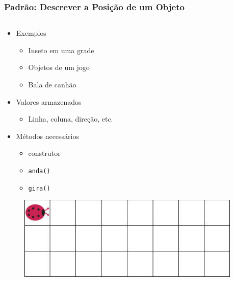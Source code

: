 \documentclass[xcolor={dvipsnames,table},aspectratio=169]{beamer}
\begin{document}
\begin{frame}[fragile]\frametitle{Padrão: Descrever a Posição de um Objeto}
\begin{columns}[T]
	\begin{column}{0.4\linewidth}
\begin{itemize}
	\item Exemplos
	\begin{itemize}
		\item Inseto em uma grade
		\item Objetos de um jogo
		\item Bala de canhão
	\end{itemize}
	\item Valores armazenados
	\begin{itemize}
		\item Linha, coluna, direção, etc.
	\end{itemize}
	\item Métodos necessários
	\begin{itemize}
		\item construtor
		\item \texttt{anda()}
		\item \texttt{gira()}
	\end{itemize}
\end{itemize}
\begin{figure}[h]
	\includegraphics[height=0.16\paperheight,center]{pucrs-ep-fprog-unidade_07-objetos_e_classes-laminas-inseto.jpg}
\end{figure}
	\end{column}
	\begin{column}{0.6\linewidth}
{\tiny\inputminted[bgcolor=cyan!10]{java}{src/inseto1/Inseto.java}}
	\end{column}
\end{columns}
\end{frame}
\end{document}
